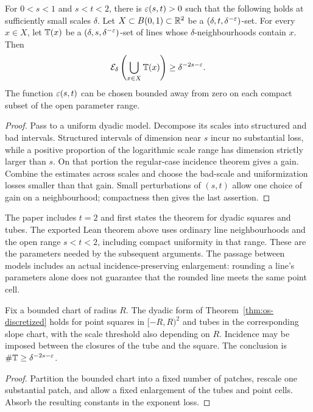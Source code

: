 \begin{theorem}
\label{thm:os-discretized}
\leanok
{}
For $0<s<1$ and $s<t<2$, there is $\varepsilon(s,t)>0$ such that the
following holds at sufficiently small scales $\delta$. Let
$X\subset B(0,1)\subset\mathbb{R}^2$ be a
$(\delta,t,\delta^{-\varepsilon})$-set. For every $x\in X$, let
$\mathbb{T}(x)$ be a $(\delta,s,\delta^{-\varepsilon})$-set of lines whose
$\delta$-neighbourhoods contain $x$. Then
\[
                 \mathcal{E}_\delta\left(\bigcup_{x\in X}\mathbb{T}(x)\right)
                             \geq\delta^{-2s-\varepsilon}.
\]
The function $\varepsilon(s,t)$ can be chosen bounded away from zero on
each compact subset of the open parameter range.
\end{theorem}
\begin{proof}
\leanok
Pass to a uniform dyadic model. Decompose its scales into structured
and bad intervals. Structured intervals of dimension near $s$ incur
no substantial loss, while a positive proportion of the logarithmic
scale range has dimension strictly larger than $s$. On that portion
the regular-case incidence theorem gives a gain. Combine the
estimates across scales and choose the bad-scale and uniformization
losses smaller than that gain. Small perturbations of $(s,t)$ allow
one choice of gain on a neighbourhood; compactness then gives the
last assertion.
\end{proof}

\begin{remark}
\label{rem:os-range}
The paper includes $t=2$ and first states the theorem for dyadic
squares and tubes. The exported Lean theorem above uses ordinary
line neighbourhoods and the open range $s<t<2$, including compact
uniformity in that range. These are the parameters needed by the
subsequent arguments. The passage between models includes an actual
incidence-preserving enlargement: rounding a line's parameters alone
does not guarantee that the rounded line meets the same point cell.
\end{remark}

\begin{theorem}
\label{thm:os-bounded}
Fix a bounded chart of radius $R$. The dyadic form of
Theorem~\ref{thm:os-discretized} holds for point squares in
$[-R,R)^2$ and tubes in the corresponding slope chart, with the
scale threshold also depending on $R$. Incidence may be imposed
between the closures of the tube and the square. The conclusion is
$\#\mathbb{T}\geq\delta^{-2s-\varepsilon}$.
\end{theorem}
\begin{proof}
Partition the bounded chart into a fixed number of patches, rescale
one substantial patch, and allow a fixed enlargement of the tubes
and point cells. Absorb the resulting constants in the exponent loss.
\end{proof}

